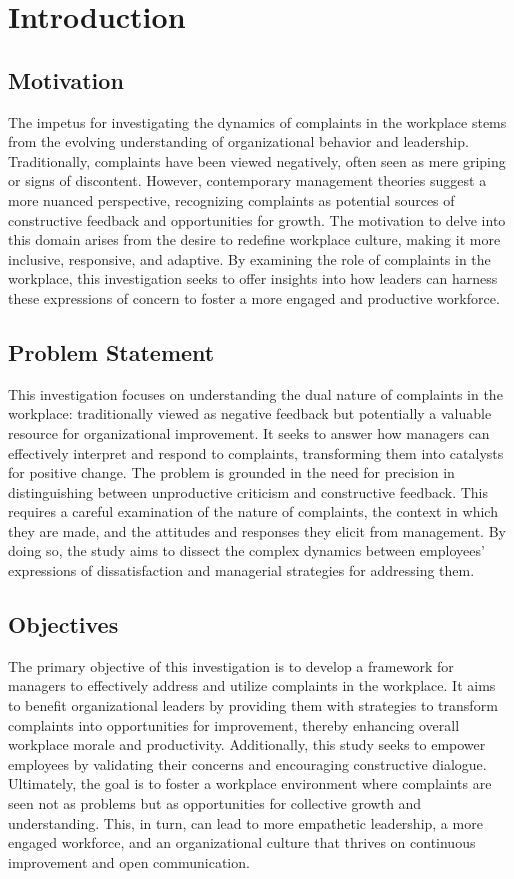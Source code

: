 \documentclass[runningheads]{llncs}
\begin{document}
\section{Introduction}

\subsection{Motivation}
The impetus for investigating the dynamics of complaints in the workplace stems from the evolving understanding of organizational behavior and leadership. Traditionally, complaints have been viewed negatively, often seen as mere griping or signs of discontent. However, contemporary management theories suggest a more nuanced perspective, recognizing complaints as potential sources of constructive feedback and opportunities for growth. The motivation to delve into this domain arises from the desire to redefine workplace culture, making it more inclusive, responsive, and adaptive. By examining the role of complaints in the workplace, this investigation seeks to offer insights into how leaders can harness these expressions of concern to foster a more engaged and productive workforce.

\subsection{Problem Statement}
This investigation focuses on understanding the dual nature of complaints in the workplace: traditionally viewed as negative feedback but potentially a valuable resource for organizational improvement. It seeks to answer how managers can effectively interpret and respond to complaints, transforming them into catalysts for positive change. The problem is grounded in the need for precision in distinguishing between unproductive criticism and constructive feedback. This requires a careful examination of the nature of complaints, the context in which they are made, and the attitudes and responses they elicit from management. By doing so, the study aims to dissect the complex dynamics between employees' expressions of dissatisfaction and managerial strategies for addressing them.

\subsection{Objectives}
The primary objective of this investigation is to develop a framework for managers to effectively address and utilize complaints in the workplace. It aims to benefit organizational leaders by providing them with strategies to transform complaints into opportunities for improvement, thereby enhancing overall workplace morale and productivity. Additionally, this study seeks to empower employees by validating their concerns and encouraging constructive dialogue. Ultimately, the goal is to foster a workplace environment where complaints are seen not as problems but as opportunities for collective growth and understanding. This, in turn, can lead to more empathetic leadership, a more engaged workforce, and an organizational culture that thrives on continuous improvement and open communication.
\end{document}
